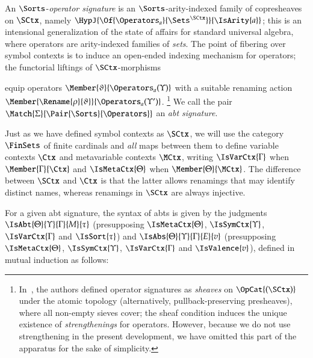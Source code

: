 \documentclass[11pt]{article}
\theoremstyle{definition}
\theoremstyle{notation}
\theoremstyle{remark}
\numberwithin{equation}{section}
\begin{document}
An $\Sorts$-\emph{operator signature} is an $\Sorts$-arity-indexed family of copresheaves on
$\SCtx$, namely $\HypJ{\Of{\Operators_a}{\Sets^\SCtx}}{\IsArity{a}}$; this is
an intensional generalization of the state of affairs for standard universal
algebra, where operators are arity-indexed families of \emph{sets}. The point
of fibering over symbol contexts is to induce an open-ended indexing
mechanism for operators; the functorial liftings of $\SCtx$-morphisms
equip operators $\Member{\vartheta}{\Operators_a(\Upsilon)}$ with a suitable
renaming action $\Member{\Rename{\rho}{\vartheta}}{\Operators_a(\Upsilon')}$.%
%
\footnote{
  In~\cite{sterling-morrison:2015}, the authors defined operator signatures as
  \emph{sheaves} on $\OpCat{(\SCtx)}$ under the atomic topology (alternatively,
  pullback-preserving presheaves), where all non-empty sieves cover; the sheaf
  condition induces the unique existence of \emph{strengthenings} for
  operators. However, because we do not use strengthening in the present
  development, we have omitted this part of the apparatus for the sake of
  simplicity.
}
%
We call the pair $\Match{\Sigma}{\Pair{\Sorts}{\Operators}}$ an \emph{abt signature}.

Just as we have defined symbol contexts as $\SCtx$, we will use the category
$\FinSets$ of finite cardinals and \emph{all} maps between them to define
variable contexts $\Ctx$ and metavariable contexts $\MCtx$, writing
$\IsVarCtx{\Gamma}$ when $\Member{\Gamma}{\Ctx}$ and $\IsMetaCtx{\Theta}$ when
$\Member{\Theta}{\MCtx}$. The difference between $\SCtx$ and $\Ctx$ is that the
latter allows renamings that may identify distinct names, whereas renamings in
$\SCtx$ are always injective.

For a given abt signature, the syntax of abts is given by the judgments
$\IsAbt{\Theta}{\Upsilon}{\Gamma}{M}{\tau}$ (presupposing $\IsMetaCtx{\Theta}$,
$\IsSymCtx{\Upsilon}$, $\IsVarCtx{\Gamma}$ and $\IsSort{\tau}$) and
$\IsAbs{\Theta}{\Upsilon}{\Gamma}{E}{v}$ (presupposing $\IsMetaCtx{\Theta}$,
$\IsSymCtx{\Upsilon}$, $\IsVarCtx{\Gamma}$ and $\IsValence{v}$), defined in
mutual induction as follows:
\end{document}
